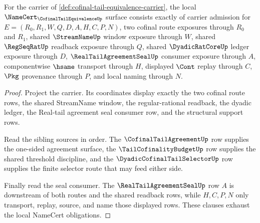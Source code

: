 \begin{theorem}
\label{thm:cofinal-tail-equivalence-namecert-obligations}
For the carrier of \autoref{def:cofinal-tail-equivalence-carrier}, the local $\NameCert_{\CofinalTailEquivalenceUp}$ surface consists exactly of carrier admission for $E=(R_0,R_1,W,Q,D,A,H,C,P,N)$, two cofinal route exposures through $R_0$ and $R_1$, shared $\StreamNameUp$ window exposure through $W$, shared $\RegSeqRatUp$ readback exposure through $Q$, shared $\DyadicRatCoreUp$ ledger exposure through $D$, $\RealTailAgreementSealUp$ consumer exposure through $A$, componentwise $\hsame$ transport through $H$, displayed $\Cont$ replay through $C$, $\Pkg$ provenance through $P$, and local naming through $N$.
\end{theorem}
\begin{proof}
Project the carrier. Its coordinates display exactly the two cofinal route rows, the shared StreamName window, the regular-rational readback, the dyadic ledger, the Real-tail agreement seal consumer row, and the structural support rows.

Read the sibling sources in order. The $\CofinalTailAgreementUp$ row supplies the one-sided agreement surface, the $\TailCofinalityBudgetUp$ row supplies the shared threshold discipline, and the $\DyadicCofinalTailSelectorUp$ row supplies the finite selector route that may feed either side.

Finally read the seal consumer. The $\RealTailAgreementSealUp$ row $A$ is downstream of both routes and the shared readback rows, while $H,C,P,N$ only transport, replay, source, and name those displayed rows. These clauses exhaust the local NameCert obligations.
\end{proof}

